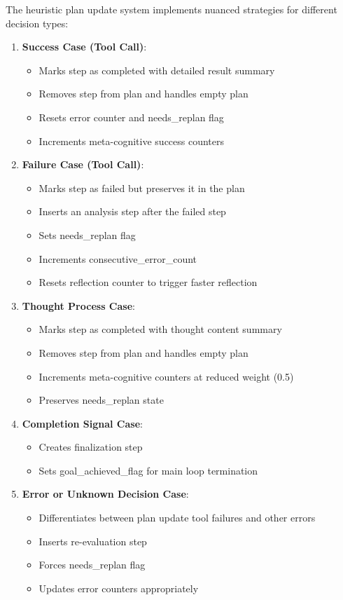 \documentclass[12pt,a4paper]{article}
\begin{document}
The heuristic plan update system implements nuanced strategies for different decision types:

\begin{enumerate}[label=\arabic*.]
    \item \textbf{Success Case (Tool Call)}:
    \begin{itemize}
        \item Marks step as completed with detailed result summary
        \item Removes step from plan and handles empty plan
        \item Resets error counter and needs\_replan flag
        \item Increments meta-cognitive success counters
    \end{itemize}

    \item \textbf{Failure Case (Tool Call)}:
    \begin{itemize}
        \item Marks step as failed but preserves it in the plan
        \item Inserts an analysis step after the failed step
        \item Sets needs\_replan flag
        \item Increments consecutive\_error\_count
        \item Resets reflection counter to trigger faster reflection
    \end{itemize}

    \item \textbf{Thought Process Case}:
    \begin{itemize}
        \item Marks step as completed with thought content summary
        \item Removes step from plan and handles empty plan
        \item Increments meta-cognitive counters at reduced weight (0.5)
        \item Preserves needs\_replan state
    \end{itemize}

    \item \textbf{Completion Signal Case}:
    \begin{itemize}
        \item Creates finalization step
        \item Sets goal\_achieved\_flag for main loop termination
    \end{itemize}

    \item \textbf{Error or Unknown Decision Case}:
    \begin{itemize}
        \item Differentiates between plan update tool failures and other errors
        \item Inserts re-evaluation step
        \item Forces needs\_replan flag
        \item Updates error counters appropriately
    \end{itemize}
\end{enumerate}
\end{document}
